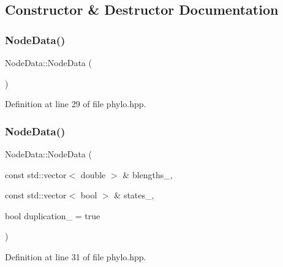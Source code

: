 \subsection{Constructor \& Destructor Documentation}
\mbox{\label{class_node_data_a56da12a9de7c80c25a905012749c8671}} 
\subsubsection{\texorpdfstring{Node\+Data()}{NodeData()}\hspace{0.1cm}{\footnotesize\ttfamily [1/2]}}
{\footnotesize\ttfamily Node\+Data\+::\+Node\+Data (\begin{DoxyParamCaption}{ }\end{DoxyParamCaption})\hspace{0.3cm}{\ttfamily [inline]}}



Definition at line 29 of file phylo.\+hpp.

\mbox{\label{class_node_data_a0a90191ba4c987afa3406f829967d8e2}} 
\subsubsection{\texorpdfstring{Node\+Data()}{NodeData()}\hspace{0.1cm}{\footnotesize\ttfamily [2/2]}}
{\footnotesize\ttfamily Node\+Data\+::\+Node\+Data (\begin{DoxyParamCaption}\item[{const std\+::vector$<$ double $>$ \&}]{blengths\+\_\+,  }\item[{const std\+::vector$<$ bool $>$ \&}]{states\+\_\+,  }\item[{bool}]{duplication\+\_\+ = {\ttfamily true} }\end{DoxyParamCaption})\hspace{0.3cm}{\ttfamily [inline]}}



Definition at line 31 of file phylo.\+hpp.

\mbox{\label{class_node_data_ad870d466c40b9be96ad79adccab79038}} 
